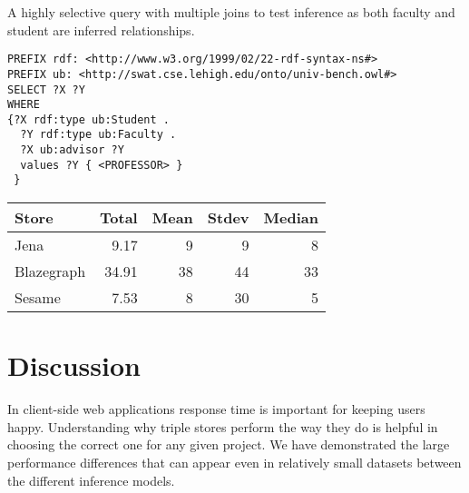 \documentclass{llncs}
\begin{document}
A highly selective query with multiple joins to test inference as both faculty and student are inferred relationships.

\begin{lstlisting}
PREFIX rdf: <http://www.w3.org/1999/02/22-rdf-syntax-ns#>
PREFIX ub: <http://swat.cse.lehigh.edu/onto/univ-bench.owl#>
SELECT ?X ?Y
WHERE
{?X rdf:type ub:Student .
  ?Y rdf:type ub:Faculty .
  ?X ub:advisor ?Y 
  values ?Y { <PROFESSOR> }
 }
\end{lstlisting}

\begin{tabular}{l | r r r r } Store & Total & Mean & Stdev & Median \\ \hline Jena & 9.17 & 9 & 9 & 8 \\ Blazegraph & 34.91 & 38 & 44 & 33 \\ Sesame & 7.53 & 8 & 30 & 5 \end{tabular}

\section{Discussion}
In client-side web applications response time is important for keeping users happy.  Understanding why triple stores perform the way they do is helpful in choosing the correct one for any given project.  We have demonstrated the large performance differences that can appear even in relatively small datasets between the different inference models.



\end{document}
